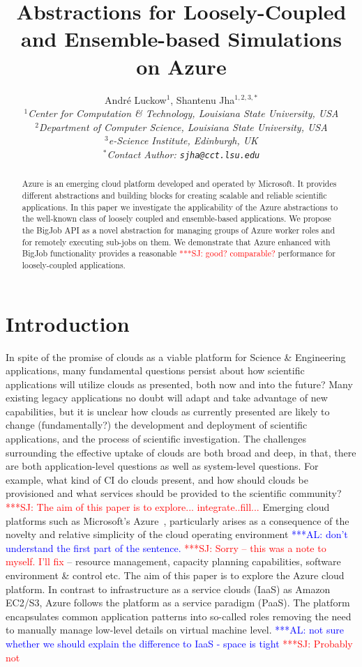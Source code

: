 \documentclass[conference,final]{IEEEtran}
\title{Abstractions for Loosely-Coupled and Ensemble-based Simulations
  on Azure\up}
\author{
Andr\'e Luckow$^{1}$, Shantenu Jha$^{1,2,3,*}$\\
  \small{\emph{$^{1}$Center for Computation \& Technology, Louisiana State University, USA}}\\
  \small{\emph{$^{2}$Department of Computer Science, Louisiana State University, USA}}\\
  \small{\emph{$^{3}$e-Science Institute, Edinburgh, UK}}\\
  \small{\emph{$^{*}$Contact Author: \texttt{sjha@cct.lsu.edu}}}\\
  \up\up\up\up
}
\newcommand{\up}{\vspace*{-1em}}
\newcommand{\alnote}[1]{ {\textcolor{blue} { ***AL: #1 }}}
\newcommand{\jhanote}[1]{ {\textcolor{red} { ***SJ: #1 }}}
\newcommand{\alnote}[1]{}
\newcommand{\jhanote}[1]{}
\begin{document}
 

\maketitle    

\begin{abstract}
  Azure is an emerging cloud platform developed and operated by
  Microsoft.  It provides different abstractions and building blocks
  for creating scalable and reliable scientific applications.  In this
  paper we investigate the applicability of the Azure abstractions to
  the well-known class of loosely coupled and ensemble-based
  applications.  We propose the BigJob API as a novel abstraction for
  managing groups of Azure worker roles and for remotely executing
  sub-jobs on them. We demonstrate that Azure enhanced with BigJob
  functionality provides a reasonable \jhanote{good? comparable?}
  performance for loosely-coupled applications.  \up \up
\end{abstract}

\section{Introduction}
\up
In spite of the promise of clouds as a viable platform for Science \&
Engineering applications, many fundamental questions persist about how
scientific applications will utilize clouds as presented, both now and
into the future? Many existing legacy applications no doubt will adapt
and take advantage of new capabilities, but it is unclear how clouds
as currently presented are likely to change (fundamentally?)  the
development and deployment of scientific applications, and the process
of scientific investigation. The challenges surrounding the effective
uptake of clouds are both broad and deep, in that, there are both
application-level questions as well as system-level questions. For
example, what kind of CI do clouds present, and how should clouds be
provisioned and what services should be provided to the scientific
community? \jhanote{The aim of this paper is to
  explore... integrate..fill...} Emerging cloud platforms such as
Microsoft's Azure~\cite{winazure}, particularly arises as a
consequence of the novelty and relative simplicity of the cloud
operating environment \alnote{don't understand the first part of the
  sentence.} \jhanote{Sorry -- this was a note to myself. I'll fix}–
resource management, capacity planning capabilities, software
environment \& control etc. The aim of this paper is to explore the
Azure cloud platform. In contrast to infrastructure as a service
clouds (IaaS) as Amazon EC2/S3, Azure follows the platform as a
service paradigm (PaaS).  The platform encapsulates common application
patterns into so-called roles removing the need to manually manage
low-level details on virtual machine level.  \alnote{not sure whether
  we should explain the difference to IaaS - space is tight}
\jhanote{Probably not}
\end{document}
